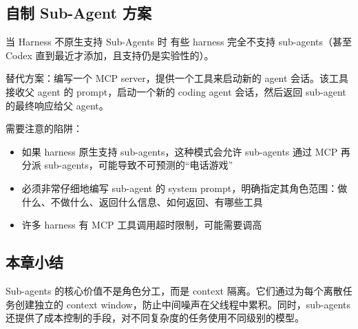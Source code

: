 \subsection{自制 Sub-Agent 方案}

\begin{knowledgebox}{当 Harness 不原生支持 Sub-Agents 时}
有些 harness 完全不支持 sub-agents（甚至 Codex 直到最近才添加，且支持仍是实验性的）。

替代方案：编写一个 MCP server，提供一个工具来启动新的 agent 会话。该工具接收父 agent 的 prompt，启动一个新的 coding agent 会话，然后返回 sub-agent 的最终响应给父 agent。

需要注意的陷阱：
\begin{itemize}[leftmargin=1.5em]
    \item 如果 harness 原生支持 sub-agents，这种模式会允许 sub-agents 通过 MCP 再分派 sub-agents，可能导致不可预测的``电话游戏''
    \item 必须非常仔细地编写 sub-agent 的 system prompt，明确指定其角色范围：做什么、不做什么、返回什么信息、如何返回、有哪些工具
    \item 许多 harness 有 MCP 工具调用超时限制，可能需要调高
\end{itemize}
\end{knowledgebox}

\subsection{本章小结}

Sub-agents 的核心价值不是角色分工，而是 context 隔离。它们通过为每个离散任务创建独立的 context window，防止中间噪声在父线程中累积。同时，sub-agents 还提供了成本控制的手段，对不同复杂度的任务使用不同级别的模型。


